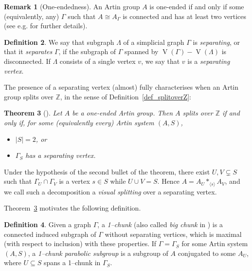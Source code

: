 \documentclass[svgnames]{amsart}
\theoremstyle{plain}
\newtheorem{thm}{Theorem}[section]
\theoremstyle{definition}
\newtheorem{defn}[thm]{Definition}
\newtheorem{rem}[thm]{Remark}
\newcommand{\Z}{\mathbb{Z}}
\newcommand{\ver}[1]{\operatorname{V}(#1)}
\begin{document}
\begin{rem}[One-endedness]\label{rem:one_end}
An Artin group $A$ is one-ended if and only if some (equivalently, any) $\Gamma$ such that $A\cong A_\Gamma$ is connected and has at least two vertices (see e.g. \cite[Remark~2.6]{JonManSar_JSJSpl} for further details). 
\end{rem}


\begin{defn}\label{defn:separating}
    We say that subgraph $\Lambda$ of a simplicial graph $\Gamma$ is \emph{separating}, or that it \emph{separates} $\Gamma$, if the subgraph of $\Gamma$ spanned by $\ver{\Gamma}-\ver{\Lambda}$ is disconnected. If $\Lambda$ consists of a single vertex $v$, we say that $v$ is a \emph{separating vertex}. 
\end{defn}
\noindent The presence of a separating vertex (almost) fully characterises when an Artin group splits over $\Z$, in the sense of Definition~\ref{def_splitoverZ}:


\begin{thm}[{\cite[Theorem A]{JonManSar_JSJSpl}}]\label{thm:no_split}
    Let $A$ be a one-ended Artin group. Then $A$ splits over $\Z$ if and only if, for some (equivalently every) Artin system $(A,S)$,
    \begin{itemize}
        \item $|S|=2$, or
        \item $\Gamma_S$ has a separating vertex.
    \end{itemize}
\end{thm}
\noindent Under the hypothesis of the second bullet of the theorem, there exist $U,V\subsetneq S$ such that $\Gamma_U\cap\Gamma_V$ is a vertex $s\in S$ while $U\cup V=S$. Hence $A=A_U*_{\langle s\rangle}A_V$, and we call such a decomposition a \emph{visual splitting} over a separating vertex.



Theorem~\ref{thm:no_split} motivates the following definition.

\begin{defn}\label{def:bigchunk}
    Given a graph $\Gamma$, a \emph{1--chunk} (also called \emph{big chunk} in \cite{JonManSar_JSJSpl}) is a connected induced subgraph of $\Gamma$ without separating vertices, which is maximal (with respect to inclusion) with these properties. If $\Gamma=\Gamma_S$ for some Artin system $(A,S)$, a \emph{1--chunk parabolic subgroup} is a subgroup of $A$ conjugated to some $A_U$, where $U \subseteq S$ spans a 1--chunk in $\Gamma_S$.
\end{defn}
\end{document}
